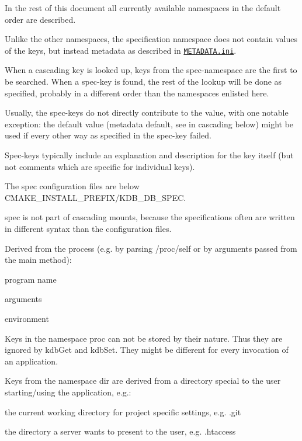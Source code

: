 In the rest of this document all currently available namespaces in the default order are described.

Unlike the other namespaces, the specification namespace does not contain values of the keys, but instead metadata as described in \href{/home/jenkins/workspace/libelektra-release/doc/METADATA.ini}{\tt {\ttfamily M\+E\+T\+A\+D\+A\+T\+A.\+ini}}.

When a cascading key is looked up, keys from the spec-\/namespace are the first to be searched. When a spec-\/key is found, the rest of the lookup will be done as specified, probably in a different order than the namespaces enlisted here.

Usually, the spec-\/keys do not directly contribute to the value, with one notable exception\+: the default value (metadata {\ttfamily default}, see in cascading below) might be used if every other way as specified in the spec-\/key failed.

Spec-\/keys typically include an explanation and description for the key itself (but not comments which are specific for individual keys).

The spec configuration files are below {\ttfamily C\+M\+A\+K\+E\+\_\+\+I\+N\+S\+T\+A\+L\+L\+\_\+\+P\+R\+E\+F\+I\+X/\+K\+D\+B\+\_\+\+D\+B\+\_\+\+S\+P\+EC}.

spec is not part of cascading mounts, because the specifications often are written in different syntax than the configuration files.

Derived from the process (e.\+g. by parsing {\ttfamily /proc/self} or by arguments passed from the main method)\+:


\begin{DoxyItemize}
\item program name
\item arguments
\item environment
\end{DoxyItemize}

Keys in the namespace proc can not be stored by their nature. Thus they are ignored by {\ttfamily kdb\+Get} and {\ttfamily kdb\+Set}. They might be different for every invocation of an application.

Keys from the namespace {\ttfamily dir} are derived from a directory special to the user starting/using the application, e.\+g.\+:


\begin{DoxyItemize}
\item the current working directory for project specific settings, e.\+g. {\ttfamily .git}
\item the directory a server wants to present to the user, e.\+g. {\ttfamily .htaccess}
\end{DoxyItemize}

